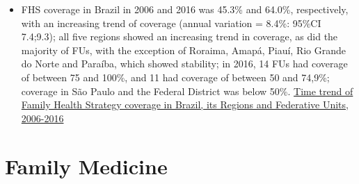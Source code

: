 \documentclass[]{book}
\begin{document}
\begin{itemize}
\item
  FHS coverage in Brazil in 2006 and 2016 was 45.3\% and 64.0\%, respectively, with an increasing trend of coverage (annual variation = 8.4\%: 95\%CI 7.4;9.3); all five regions showed an increasing trend in coverage, as did the majority of FUs, with the exception of Roraima, Amapá, Piauí, Rio Grande do Norte and Paraíba, which showed stability; in 2016, 14 FUs had coverage of between 75 and 100\%, and 11 had coverage of between 50 and 74,9\%; coverage in São Paulo and the Federal District was below 50\%. \href{https://www.scielosp.org/pdf/ress/2018.v27n3/e2017170/en}{Time trend of Family Health Strategy coverage in Brazil, its Regions and Federative Units, 2006-2016}
\end{itemize}

\hypertarget{family-medicine}{%
\section*{Family Medicine}\label{family-medicine}}
\end{document}
